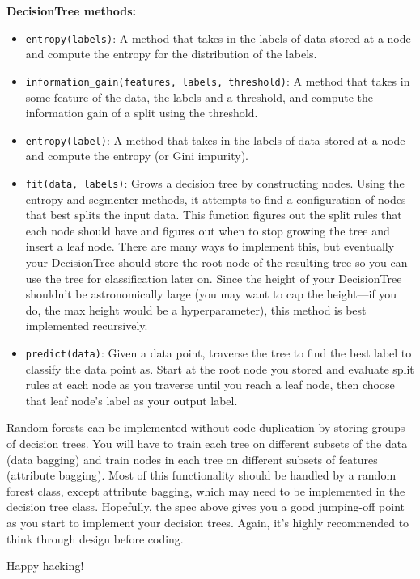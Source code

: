 \textbf{DecisionTree methods:}
\begin{itemize}
    \item \verb|entropy(labels)|: A method that takes in the labels of data stored at a node and compute the entropy for the distribution of the labels.
    
    \item \verb|information_gain(features, labels, threshold)|: A method that takes in some feature of the data, the labels and a threshold, and compute the information gain of a split using the threshold. 
    
	\item \verb|entropy(label)|: A method that takes in the labels of data stored at a node and compute the entropy (or Gini impurity).

	
	\item \verb|fit(data, labels)|: Grows a decision tree by constructing nodes. Using the entropy and segmenter methods, it attempts to find a configuration of nodes that best splits the input data. This function figures out the split rules that each node should have and figures out when to stop growing the tree and insert a leaf node. There are many ways to implement this, but eventually your DecisionTree should store the root node of the resulting tree so you can use the tree for classification later on. Since the height of your DecisionTree shouldn't be astronomically large (you may want to cap the height---if you do, the max height would be a hyperparameter), this method is best implemented recursively.
	\item \verb|predict(data)|: Given a data point, traverse the tree to find the best label to classify the data point as. Start at the root node you stored and evaluate split rules at each node as you traverse until you reach a leaf node, then choose that leaf node's label as your output label.
\end{itemize}

Random forests can be implemented without code duplication by storing groups of decision trees. You will have to train each tree on different subsets of the data (data bagging) and train nodes in each tree on different subsets of features (attribute bagging). Most of this functionality should be handled by a random forest class, except attribute bagging, which may need to be implemented in the decision tree class. Hopefully, the spec above gives you a good jumping-off point as you start to implement your decision trees. Again, it's highly recommended to think through design before coding.

Happy hacking!